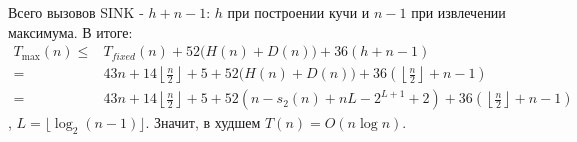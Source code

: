 \documentclass[12pt]{article}
\begin{document}
Всего вызовов SINK - $h+n-1$: $h$ при построении кучи и $n-1$ при извлечении максимума. В итоге:
\[
\begin{aligned}
T_{\max}(n)\leq{}&T_{fixed}(n)
+52\bigl(H(n)+D(n)\bigr)+36(h+n-1)\\
=&43n+14\left\lfloor\frac n2\right\rfloor+5
+52\bigl(H(n)+D(n)\bigr)
+36\left(\left\lfloor\frac n2\right\rfloor+n-1\right)\\
= &43n+14\left\lfloor\frac n2\right\rfloor+5
+52\left(n-s_2(n)+nL-2^{L+1}+2\right)
+36\left(\left\lfloor\frac n2\right\rfloor+n-1\right)
\end{aligned}
\]
, $L=\lfloor\log_2(n-1)\rfloor$. Значит, в худшем $T(n)=O(n\log n)$.
\end{document}
